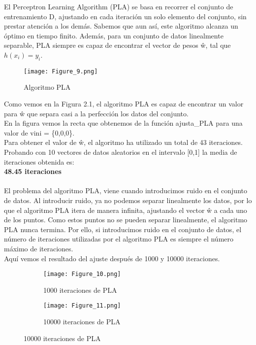 El Perceptron Learning Algorithm (PLA) se basa en recorrer el conjunto de entrenamiento D, ajustando en cada iteración un solo elemento del conjunto, sin prestar atención a los demás.
Sabemos que aun así, este algoritmo alcanza un óptimo en tiempo finito.  Además, para un conjunto de datos linealmente separable, PLA siempre es capaz de encontrar el vector de pesos ŵ, tal que $ h(x_{i}) = y_{i} $.

\begin{figure}[h]
   \centering
   \texttt{[image: Figure\_9.png]}
   \caption{Algoritmo PLA}
\end{figure}

Como vemos en la Figura 2.1, el algoritmo PLA es capaz de encontrar un valor para ŵ que separa casi a la perfección los datos del conjunto.\\
En la figura vemos la recta que obtenemos de la función ajusta\_PLA para una valor de vini = \{0,0,0\}.\\
Para obtener el valor de ŵ, el algoritmo ha utilizado un total de 43 iteraciones.\\
Probando con 10 vectores de datos aleatorios en el intervalo [0,1] la media de iteraciones obtenida es:\\ \textbf{48.45 iteraciones}
\\\\
El problema del algoritmo PLA, viene cuando introducimos ruido en el conjunto de datos.
Al introducir ruido, ya no podemos separar linealmente los datos, por lo que el algoritmo PLA itera de manera infinita, ajustando el vector ŵ a cada uno de los puntos.
Como estos puntos no se pueden separar linealmente, el algoritmo PLA nunca termina. Por ello, si introducimos ruido en el conjunto de datos, el número de iteraciones utilizadas por el algoritmo PLA es siempre el número máximo de iteraciones.
\\
Aquí vemos el resultado del ajuste después de 1000 y 10000 iteraciones.

\begin{figure}[h]
   \centering
   \begin{subfigure}[b]{0.45\textwidth}
      \texttt{[image: Figure\_10.png]}
      \caption{1000 iteraciones de PLA}
   \end{subfigure}
   \hfill
   \begin{subfigure}[b]{0.45\textwidth}
      \texttt{[image: Figure\_11.png]}
      \caption{10000 iteraciones de PLA}
   \end{subfigure}
\end{figure}

